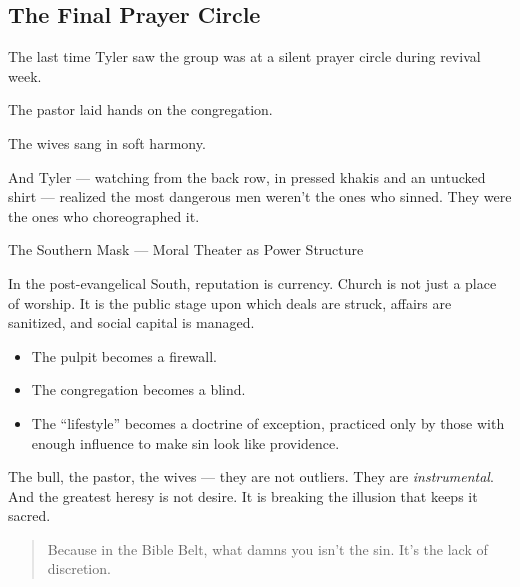 \subsection{The Final Prayer Circle}

The last time Tyler saw the group was at a silent prayer circle during revival week.

The pastor laid hands on the congregation.

The wives sang in soft harmony.

And Tyler — watching from the back row, in pressed khakis and an untucked shirt — realized the most dangerous men weren’t the ones who sinned.  
They were the ones who choreographed it.

\begin{HistoricalSidebar}{The Southern Mask — Moral Theater as Power Structure}

In the post-evangelical South, reputation is currency.  
Church is not just a place of worship.  
It is the public stage upon which deals are struck, affairs are sanitized, and social capital is managed.

\begin{itemize}
  \item The pulpit becomes a firewall.  
  \item The congregation becomes a blind.  
  \item The “lifestyle” becomes a doctrine of exception, practiced only by those with enough influence to make sin look like providence.
\end{itemize}

The bull, the pastor, the wives — they are not outliers.  
They are \textit{instrumental}.  
And the greatest heresy is not desire.  
It is breaking the illusion that keeps it sacred.

\end{HistoricalSidebar}

\begin{quote}
Because in the Bible Belt,  
what damns you isn’t the sin.  
It’s the lack of discretion.
\end{quote}
